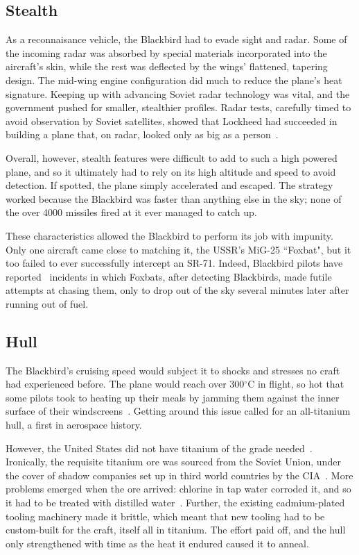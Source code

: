 \documentclass[12pt, draftclsnofoot, onecolumn]{IEEEtran}
\begin{document}
	\subsection{Stealth}
	
		As a reconnaisance vehicle, the Blackbird had to evade sight and radar. Some of the incoming radar was absorbed by special materials incorporated into the aircraft's skin, while the rest was deflected by the wings' flattened, tapering design. The mid-wing engine configuration did much to reduce the plane's heat signature. Keeping up with advancing Soviet radar technology was vital, and the government pushed for smaller, stealthier profiles. Radar tests, carefully timed to avoid observation by Soviet satellites, showed that Lockheed had succeeded in building a plane that, on radar, looked only as big as a person~\cite{creating}.
		
		Overall, however, stealth features were difficult to add to such a high powered plane, and so it ultimately had to rely on its high altitude and speed to avoid detection. If spotted, the plane simply accelerated and escaped. The strategy worked because the Blackbird was faster than anything else in the sky; none of the over 4000\cite{sleddriver} missiles fired at it ever managed to catch up.
		
		These characteristics allowed the Blackbird to perform its job with impunity. Only one aircraft came close to matching it, the USSR's MiG-25 ``Foxbat", but it too failed to ever successfully intercept an SR-71. Indeed, Blackbird pilots have reported~\cite{sleddriver} incidents in which Foxbats, after detecting Blackbirds, made futile attempts at chasing them, only to drop out of the sky several minutes later after running out of fuel.
		
	\subsection{Hull}
		The Blackbird's cruising speed would subject it to shocks and stresses no craft had experienced before. The plane would reach over 300$^\circ$C in flight, so hot that some pilots took to heating up their meals by jamming them against the inner surface of their windscreens~\cite{bbc}. Getting around this issue called for an all-titanium hull, a first in aerospace history.
		
		However, the United States did not have titanium of the grade needed~\cite{skunkworks}. Ironically, the requisite titanium ore was sourced from the Soviet Union, under the cover of shadow companies set up in third world countries by the CIA~\cite{bbc,skunkworks}. More problems emerged when the ore arrived: chlorine in tap water corroded it, and so it had to be treated with distilled water~\cite{skunkworks}. Further, the existing cadmium-plated tooling machinery made it brittle, which meant that new tooling had to be custom-built for the craft, itself all in titanium. The effort paid off, and the hull only strengthened with time as the heat it endured caused it to anneal.
		
\end{document}
